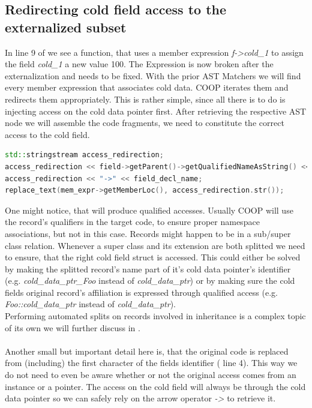 \subsection{Redirecting cold field access to the externalized subset}
In line 9 of  we see a function, that uses a member expression \textit{f->cold\_1} to assign the field \textit{cold\_1} a new value 100. The Expression is now broken after the externalization and needs to be fixed. With the prior AST Matchers we will find every member expression that associates cold data. COOP iterates them and redirects them appropriately. This is rather simple, since all there is to do is injecting access on the cold data pointer first. After retrieving the respective AST node we will assemble the code fragments, we need to constitute the correct access to the cold field.\\
\begin{lstlisting}[language=C++, name={Assembling the proper access ot a cold field through the additional indirection.}, label={redirect_assembly}, morekeywords={stringstream, std}]
std::stringstream access_redirection;
access_redirection << field->getParent()->getQualifiedNameAsString() << "::";
access_redirection << "->" << field_decl_name;
replace_text(mem_expr->getMemberLoc(), access_redirection.str());
\end{lstlisting}
One might notice, that  will produce qualified accesses. Usually COOP will use the record's qualifiers in the target code, to ensure proper namespace associations, but not in this case. Records might happen to be in a sub/super class relation. Whenever a super class and its extension are both splitted we need to ensure, that the right cold field struct is accessed. This could either be solved by making the splitted record's name part of it's cold data pointer's identifier (e.g. \textit{cold\_data\_ptr\_Foo} instead of \textit{cold\_data\_ptr}) or by making sure the cold fields original record's affiliation is expressed through qualified access (e.g. \textit{Foo::cold\_data\_ptr} instead of \textit{cold\_data\_ptr}).\\
Performing automated splits on records involved in inheritance is a complex topic of its own we will further discuss in .\\\\
Another small but important detail here is, that the original code is replaced from (including) the first character of the fields identifier ( line 4). This way we do not need to even be aware whether or not the original access comes from an instance or a pointer. The access on the cold field will always be through the cold data pointer so we can safely rely on the arrow operator \textit{->} to retrieve it.

